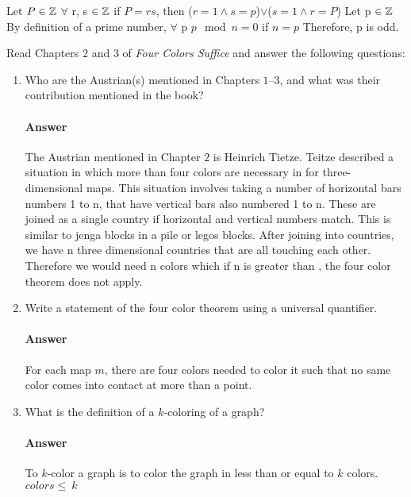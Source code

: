 \documentclass{article}
\begin{document}
  Let $P \in {\mathbb Z}$
  $\forall$ r, s $\in {\mathbb Z}$
  if $P = rs$, then ($r=1 \land s=p$)$\lor$($s=1 \land r=P$)
  Let p $\in {\mathbb Z}$
  By definition of a prime number,
  $\forall$ p $p\mod{n} = 0$ if $n=p$
  Therefore, p is odd.


%
Read Chapters $2$ and $3$ of \emph{Four Colors Suffice} and answer the following
 questions:

\begin{enumerate}

    \item Who are the Austrian(s) mentioned in Chapters $1$--$3$, and what was
    their contribution mentioned in the book?

        \paragraph{Answer}
        The Austrian mentioned in Chapter $2$ is Heinrich Tietze. Teitze
        described a situation in which more than four colors are necessary in
        for three-dimensional maps. This situation involves taking a number of
        horizontal bars numbers 1 to n, that have vertical bars also
        numbered 1 to n. These are joined as a single country  if horizontal
        and vertical numbers match.
        This is similar to jenga blocks in a pile or legos blocks.
        After joining into countries, we have n three dimensional countries
         that are all touching each other.
        Therefore we would need n colors which if n is greater than ,
        the four color theorem does not apply.

    \item Write a statement of the four color theorem using a universal
        quantifier.

        \paragraph{Answer}
        For each map $m$, there are four colors needed to color it such that
        no same color comes into contact at more than a point.

    \item What is the definition of a $k$-coloring of a graph?

        \paragraph{Answer}
        To $k$-color a graph is to color the graph in less than or equal to
        $k$ colors. $colors\leq \ k$


\end{enumerate}
\end{document}

